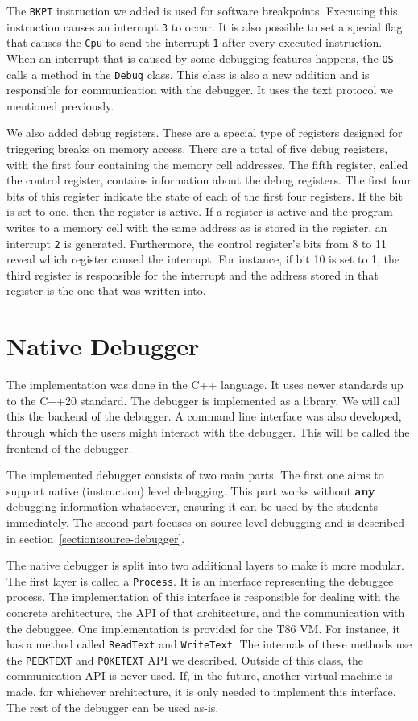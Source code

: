 The \texttt{BKPT} instruction we added is used for software breakpoints.
Executing this instruction causes an interrupt \texttt{3} to occur. It is also
possible to set a special flag that causes the \texttt{Cpu} to send the
interrupt \texttt{1} after every executed instruction. When an interrupt that
is caused by some debugging features happens, the \texttt{OS} calls a method
in the \texttt{Debug} class. This class is also a new addition and is
responsible for communication with the debugger. It uses the text protocol we
mentioned previously.

We also added debug registers. These are a special type of registers designed
for triggering breaks on memory access. There are a total of five debug
registers, with the first four containing the memory cell addresses. The fifth
register, called the control register, contains information about the debug
registers. The first four bits of this register indicate the state of each of
the first four registers. If the bit is set to one, then the register is
active. If a register is active and the program writes to a memory cell with
the same address as is stored in the register, an interrupt \texttt{2} is
generated. Furthermore, the control register's bits from 8 to 11 reveal which
register caused the interrupt. For instance, if bit 10 is set to 1, the third
register is responsible for the interrupt and the address stored in that
register is the one that was written into.

\section{Native Debugger}
The implementation was done in the C++ language. It uses newer standards up to
the C++20 standard. The debugger is implemented as a library. We will call this
the backend of the debugger. A command line interface was also developed,
through which the users might interact with the debugger. This will be called
the frontend of the debugger.

The implemented debugger consists of two main parts. The first one aims to
support native (instruction) level debugging. This part works without
\textbf{any} debugging information whatsoever, ensuring it can be used by the
students immediately. The second part focuses on source-level debugging and is
described in section~\ref{section:source-debugger}.

The native debugger is split into two additional layers to make it more
modular. The first layer is called a \texttt{Process}. It is an interface
representing the debuggee process. The implementation of this interface is
responsible for dealing with the concrete architecture, the API of that
architecture, and the communication with the debuggee. One implementation is
provided for the T86 VM. For instance, it has a method called \texttt{ReadText}
and \texttt{WriteText}. The internals of these methods use the
\texttt{PEEKTEXT} and \texttt{POKETEXT} API we described. Outside of this
class, the communication API is never used. If, in the future, another virtual
machine is made, for whichever architecture, it is only needed to implement
this interface. The rest of the debugger can be used as-is.

